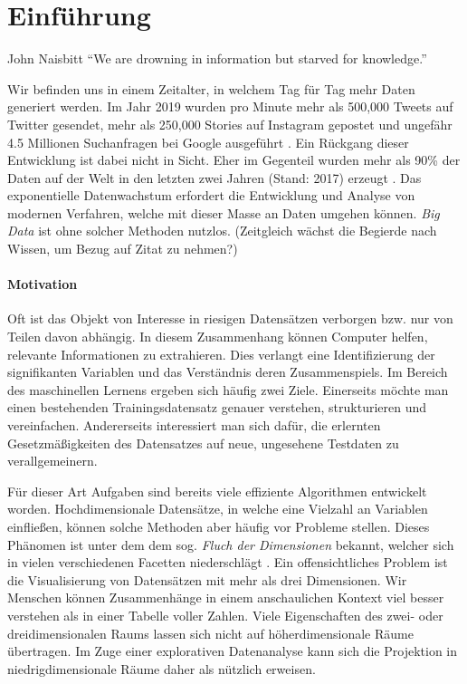 \chapter{Einführung}

\label{introduction}

\begin{chapquote}{John Naisbitt}
``We are drowning in information but starved for knowledge.''
\end{chapquote}

Wir befinden uns in einem Zeitalter, in welchem Tag für Tag mehr Daten generiert werden. Im Jahr 2019 wurden pro Minute mehr als 500,000 Tweets auf Twitter gesendet, mehr als 250,000 Stories auf Instagram gepostet und ungefähr 4.5 Millionen Suchanfragen bei Google ausgeführt \cite{domo}. Ein Rückgang dieser Entwicklung ist dabei nicht in Sicht. Eher im Gegenteil wurden mehr als 90\% der Daten auf der Welt in den letzten zwei Jahren (Stand: 2017) erzeugt \cite{ibm}. Das exponentielle Datenwachstum erfordert die Entwicklung und Analyse von modernen Verfahren, welche mit dieser Masse an Daten umgehen können. \textit{Big Data} ist ohne solcher Methoden nutzlos. 
(Zeitgleich wächst die Begierde nach Wissen, um Bezug auf Zitat zu nehmen?)
 
 


\subsubsection{Motivation}

Oft ist das Objekt von Interesse in riesigen Datensätzen verborgen bzw. nur von Teilen davon abhängig. In diesem Zusammenhang können Computer helfen, relevante Informationen zu extrahieren. Dies verlangt eine Identifizierung der signifikanten Variablen und das Verständnis deren Zusammenspiels. Im Bereich des maschinellen Lernens ergeben sich häufig zwei Ziele. Einerseits möchte man einen bestehenden Trainingsdatensatz genauer verstehen, strukturieren und vereinfachen. Andererseits interessiert man sich dafür, die erlernten Gesetzmäßigkeiten des Datensatzes auf neue, ungesehene Testdaten zu verallgemeinern. 

Für dieser Art Aufgaben sind bereits viele effiziente Algorithmen entwickelt worden. Hochdimensionale Datensätze, in welche eine Vielzahl an Variablen einfließen, können solche Methoden aber häufig vor Probleme stellen. Dieses Phänomen ist unter dem dem sog. \textit{Fluch der Dimensionen} bekannt, welcher sich in vielen verschiedenen Facetten niederschlägt \cite{bellman}. Ein offensichtliches Problem ist die Visualisierung von Datensätzen mit mehr als drei Dimensionen. Wir Menschen können Zusammenhänge in einem anschaulichen Kontext viel besser verstehen als in einer Tabelle voller Zahlen. Viele Eigenschaften des zwei- oder dreidimensionalen Raums lassen sich nicht auf höherdimensionale Räume übertragen. Im Zuge einer explorativen Datenanalyse kann sich die Projektion in niedrigdimensionale Räume daher als nützlich erweisen.

